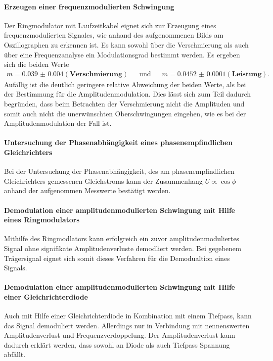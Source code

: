 \paragraph{Erzeugen einer frequenzmodulierten Schwingung}
Der Ringmodulator mit Laufzeitkabel eignet sich zur Erzeugung
eines frequenzmodulierten Signales, wie anhand des aufgenommenen Bilds
am Oszillographen zu erkennen ist.
Es kann sowohl über
die Verschmierung als auch über eine Frequenzanalyse
ein Modulationsgrad bestimmt werden.
Es ergeben sich die beiden Werte
\begin{align}
  m = \num{0.039(4)}(\textbf{Verschmierung})& &\text{und}& &m=\num{0.0452(1)}(\textbf{Leistung}).
\end{align}
Aufällig ist die deutlich geringere relative Abweichung der beiden Werte,
als bei der Bestimmung für die Amplitudenmodulation.
Dies lässt sich zum Teil dadurch begründen, dass beim Betrachten der Verschmierung nicht die
Amplituden und somit auch nicht die unerwünschten Oberschwingungen eingehen,
wie es bei der Amplitudenmodulation der Fall ist.

\paragraph{Untersuchung der Phasenabhängigkeit eines
phasenempfindlichen Gleichrichters}
Bei der Untersuchung der Phasenabhängigkeit, des am phasenempfindlichen
Gleichrichters gemessenen Gleichstroms kann der Zusammenhang $U \propto \cos \phi$ anhand der
aufgenommen Messwerte bestätigt werden.

\paragraph{Demodulation einer amplitudenmodulierten Schwingung
mit Hilfe eines Ringmodulators}
Mithilfe des Ringmodlators kann erfolgreich
ein zuvor amplitudenmoduliertes Signal ohne signifikate Amplitudenverluste
demodliert werden.
Bei gegebenem Trägersignal eignet sich somit dieses Verfahren für die
Demodualtion eines Signals.

\paragraph{Demodulation einer amplitudenmodulierten Schwingung
mit Hilfe einer Gleichrichterdiode}
Auch mit Hilfe einer Gleichrichterdiode in Kombination mit einem
Tiefpass, kann das Signal demoduliert werden.
Allerdings nur in Verbindung mit nennenswerten
Amplitudenverlust und Frequenzverdoppelung.
Der Amplitudenverlust kann dadurch erklärt werden, dass sowohl
an Diode als auch Tiefpass Spannung abfällt.

